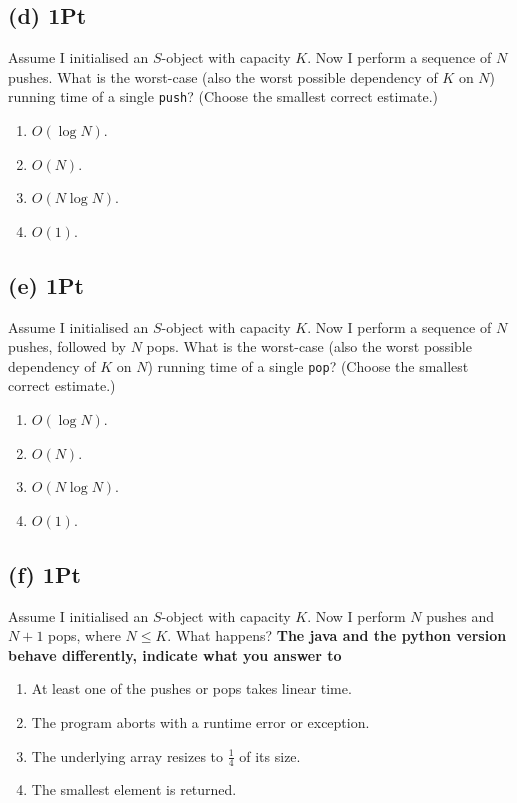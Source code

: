 \documentclass{tufte-handout}
\begin{document}
      \subsection*{(d) 1Pt}
      Assume I initialised an $S$-object with capacity $K$. 
      Now I perform a sequence of $N$ pushes.
      What is the worst-case (also the worst possible dependency of $K$ on $N$) running time of a single \texttt{push}?  (Choose the smallest correct estimate.)
      \begin{enumerate}
        \item $O(\log N)$. \\
        \item $O(N)$. \\
        \item $O(N\log N)$. \\
        \item  $O(1)$. \\
      \end{enumerate} 

      \subsection*{(e) 1Pt}
      Assume I initialised an $S$-object with capacity $K$. 
      Now I perform a sequence of $N$ pushes, followed by $N$ pops.
      What is the worst-case (also the worst possible dependency of $K$ on $N$) running time of a single \texttt{pop}?  (Choose the smallest correct estimate.)
      \begin{enumerate}
        \item $O(\log N)$. \\
        \item $O(N)$. \\
        \item $O(N\log N)$. \\
        \item  $O(1)$. \\
      \end{enumerate} 
      \subsection*{(f) 1Pt}
      Assume I initialised an $S$-object with capacity $K$. 
      Now I perform $N$ pushes and $N+1$ pops, where $N\leq K$.
      What happens? \textbf{The java and the python version behave differently, indicate what you answer to}
      \begin{enumerate}
	\item At least one of the pushes or pops takes linear time. \\
	\item The program aborts with a runtime error or exception. \\
	\item The underlying array resizes to $\frac{1}{4}$ of its size. \\
	\item The smallest element is returned. \\
      \end{enumerate} 
\end{document}
